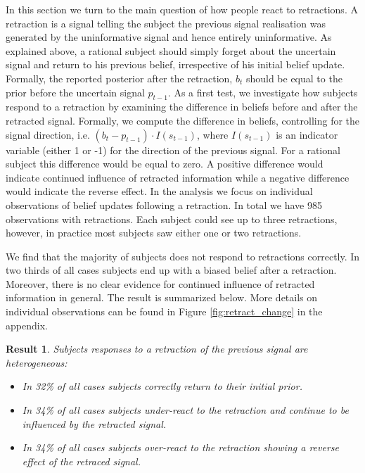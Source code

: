 \documentclass{article}
\newtheorem{result}{Result}
\newenvironment{Result}{\begin{result} \rm }{\end{result}}
\begin{document}
In this section we turn to the main question of how people react to retractions. A retraction is a signal telling the subject the previous signal realisation was generated by the uninformative signal and hence entirely uninformative. As explained above, a rational subject should simply forget about the uncertain signal and return to his previous belief, irrespective of his initial belief update. Formally, the reported posterior after the retraction, $b_t$ should be equal to the prior before the uncertain signal $p_{t-1}$. As a first test, we investigate how subjects respond to a retraction by examining the difference in beliefs before and after the retracted signal. Formally, we compute the difference in beliefs, controlling for the signal direction, i.e. $(b_t-p_{t-1}) \cdot I(s_{t-1})$, where $I(s_{t-1})$ is an indicator variable (either 1 or -1) for the direction of the previous signal. For a rational subject this difference would be equal to zero. A positive difference would indicate continued influence of retracted information while a negative difference would indicate the reverse effect. In the analysis we focus on individual observations of belief updates following a retraction. In total we have 985 observations with retractions. Each subject could see up to three retractions, however, in practice most subjects saw either one or two retractions. 

We find that the majority of subjects does not respond to retractions correctly. In two thirds of all cases subjects end up with a biased belief after a retraction. Moreover, there is no clear evidence for continued influence of retracted information in general. The result is summarized below. More details on individual observations can be found in Figure \ref{fig:retract_change} in the appendix.

\begin{Result}
    Subjects responses to a retraction of the previous signal are heterogeneous:
    \begin{itemize}
        \item In 32\% of all cases subjects correctly return to their initial prior.
        \item In 34\% of all cases subjects under-react to the retraction and continue to be influenced by the retracted signal.
        \item In 34\% of all cases subjects over-react to the retraction showing a reverse effect of the retraced signal.
    \end{itemize} 
\end{Result}
\end{document}
